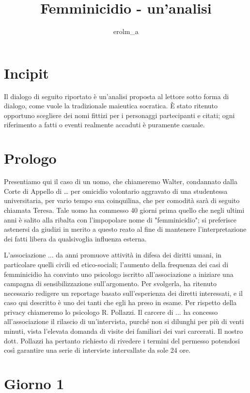 \documentclass[a4paper,12pt]{article}
\title{Femminicidio - un'analisi}
\author{erolm\_a}
\begin{document}
\maketitle

\pagebreak

\section*{Incipit}

Il dialogo di seguito riportato è un'analisi proposta al lettore sotto forma di dialogo, come vuole la tradizionale maieutica socratica. È stato ritenuto opportuno scegliere dei nomi fittizi per i personaggi partecipanti e citati; ogni riferimento a fatti o eventi realmente accaduti è puramente casuale.

\section*{Prologo}
Presentiamo qui il caso di un uomo, che chiameremo Walter, condannato dalla Corte di Appello di … per omicidio volontario aggravato di una studentessa universitaria, per vario tempo sua coinquilina, che per comodità sarà di seguito chiamata Teresa. Tale uomo ha commesso 40 giorni prima quello che negli ultimi anni è salito alla ribalta con l'impopolare nome di "femminicidio"; si preferisce astenersi da giudizi in merito a questo reato al fine di mantenere l'interpretazione dei fatti libera da qualsivoglia influenza esterna.

L'associazione ... da anni promuove attività in difesa dei diritti umani, in particolare quelli civili ed etico-sociali; l’aumento della frequenza dei casi di femminicidio ha convinto uno psicologo iscritto all’associazione a iniziare una campagna di sensibilizzazione sull’argomento. Per svolgerla, ha ritenuto necessario redigere un reportage basato sull’esperienza dei diretti interessati, e il caso qui descritto è uno dei tanti che egli ha preso in esame. Per rispetto della privacy chiameremo lo psicologo R. Pollazzi.
Il carcere di ... ha concesso all'associazione il rilascio di un'intervista, purché non si dilunghi per più di venti minuti, vista l'elevata domanda di visite dei familiari dei vari carcerati. Il nostro dott. Pollazzi ha pertanto richiesto di rivedere i termini del permesso potendosi così garantire una serie di interviste intervallate da sole 24 ore.

\pagebreak
\section*{Giorno 1}
\end{document}
